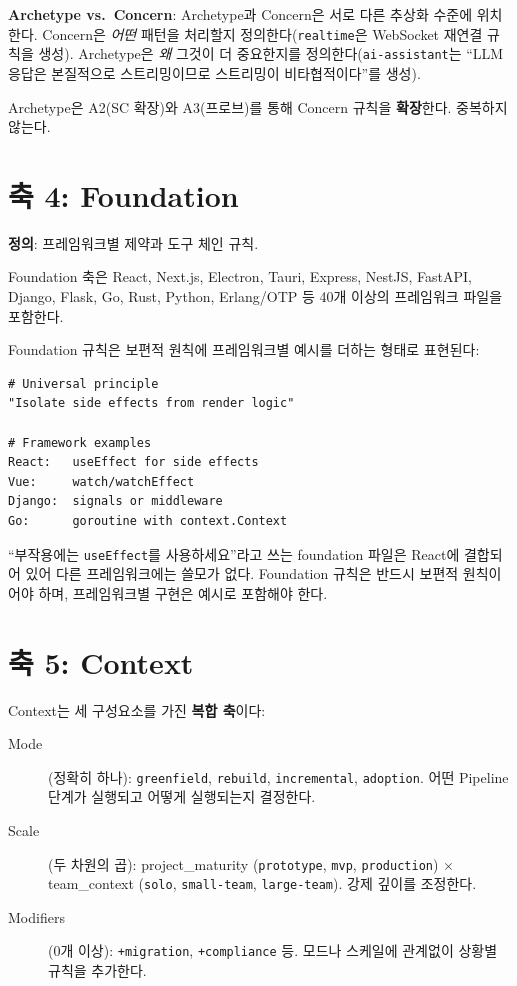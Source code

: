 \documentclass[11pt,a4paper,openright,twoside]{report}
\begin{document}
\textbf{Archetype vs.\ Concern}: Archetype과 Concern은 서로 다른 추상화 수준에 위치한다. Concern은 \emph{어떤} 패턴을 처리할지 정의한다(\texttt{realtime}은 WebSocket 재연결 규칙을 생성). Archetype은 \emph{왜} 그것이 더 중요한지를 정의한다(\texttt{ai-assistant}는 ``LLM 응답은 본질적으로 스트리밍이므로 스트리밍이 비타협적이다''를 생성).

Archetype은 A2(SC 확장)와 A3(프로브)를 통해 Concern 규칙을 \textbf{확장}한다. 중복하지 않는다.

\section{축 4: Foundation}

\textbf{정의}: 프레임워크별 제약과 도구 체인 규칙.

Foundation 축은 React, Next.js, Electron, Tauri, Express, NestJS, FastAPI, Django, Flask, Go, Rust, Python, Erlang/OTP 등 40개 이상의 프레임워크 파일을 포함한다.

Foundation 규칙은 보편적 원칙에 프레임워크별 예시를 더하는 형태로 표현된다:

\begin{lstlisting}[title={Foundation Rule Pattern}]
# Universal principle
"Isolate side effects from render logic"

# Framework examples
React:   useEffect for side effects
Vue:     watch/watchEffect
Django:  signals or middleware
Go:      goroutine with context.Context
\end{lstlisting}

\begin{dangerbox}[안티패턴]
``부작용에는 \texttt{useEffect}를 사용하세요''라고 쓰는 foundation 파일은 React에 결합되어 있어 다른 프레임워크에는 쓸모가 없다. Foundation 규칙은 반드시 보편적 원칙이어야 하며, 프레임워크별 구현은 예시로 포함해야 한다.
\end{dangerbox}

\section{축 5: Context}

Context는 세 구성요소를 가진 \textbf{복합 축}이다:

\begin{description}
  \item[Mode] (정확히 하나): \texttt{greenfield}, \texttt{rebuild}, \texttt{incremental}, \texttt{adoption}. 어떤 Pipeline 단계가 실행되고 어떻게 실행되는지 결정한다.
  \item[Scale] (두 차원의 곱): project\_maturity (\texttt{prototype}, \texttt{mvp}, \texttt{production}) $\times$ team\_context (\texttt{solo}, \texttt{small-team}, \texttt{large-team}). 강제 깊이를 조정한다.
  \item[Modifiers] (0개 이상): \texttt{+migration}, \texttt{+compliance} 등. 모드나 스케일에 관계없이 상황별 규칙을 추가한다.
\end{description}
\end{document}
